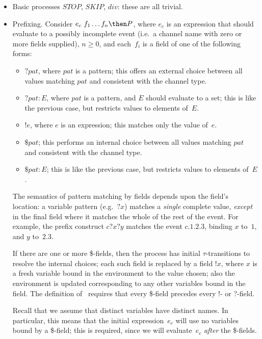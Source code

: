 \begin{itemize}
\item Basic processes $STOP$, $SKIP$, $div$: these are all trivial. 

\item Prefixing.  Consider $e_c ~ f_1 \ldots f_n \then P$, where $e_c$ is an
  expression that should evaluate to a possibly incomplete event (i.e.~a
  channel name with zero or more fields supplied), $n \ge 0$, and each~$f_i$
  is a field of one of the following forms:
  \begin{itemize}
  \item $? pat$, where $pat$ is a pattern; this offers an external choice
    between all values matching $pat$ and consistent with the channel type. 

  \item $?pat : E$, where $pat$ is a pattern, and $E$ should evaluate to a
    set; this is like the previous case, but restricts values to elements
    of~$E$. 

  \item $!e$, where $e$ is an expression; this matches only the value of~$e$. 

  \item $\$ pat$; this performs an internal choice between all values matching
    $pat$ and consistent with the channel type.
 
  \item $\$ pat : E$; this is like the previous case, but restricts values to
    elements of~$E$.
  \end{itemize}
  The semantics of pattern matching by fields depends upon the field's
  location: a variable pattern (e.g.~$?x$) matches a \emph{single} complete
  value, \emph{except} in the final field where it matches the whole of the
  rest of the event.  For example, the prefix construct $c?x?y$ matches the
  event $c.1.2.3$, binding $x$ to~$1$, and $y$ to~$2.3$.

  If there are one or more \$-fields, then the process has initial
  $\tau$-transitions to resolve the internal choices; each such field is
  replaced by a field $!x$, where $x$ is a fresh variable bound in the
  environment to the value chosen; also the environment is updated
  corresponding to any other variables bound in the field.  The definition of
  \CSPm\ requires that every \$-field precedes every !- or ?-field.

  Recall that we assume that distinct variables have distinct names.  In
  particular, this means that the initial expression~$e_c$ will use no
  variables bound by a \$-field; this is required, since we will
  evaluate~$e_c$ \emph{after} the \$-fields. 


\end{itemize}

